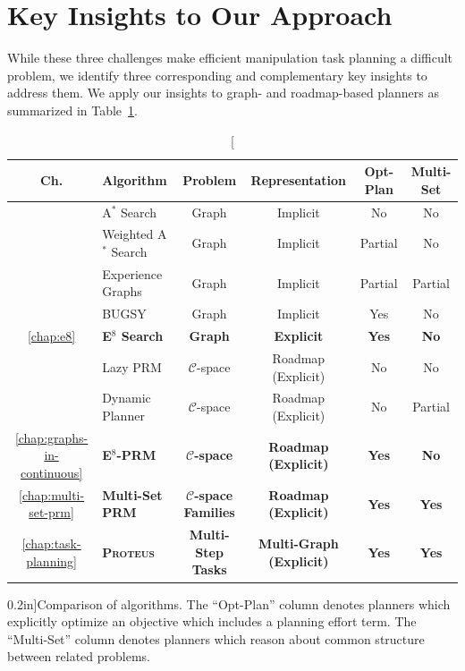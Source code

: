\section*{Key Insights to Our Approach}

While these three challenges make efficient
manipulation task planning a difficult problem,
we identify three corresponding and complementary
key insights to address them.
We apply our insights to graph- and roadmap-based planners
as summarized in Table~\ref{table:intro-algorithms}.

\begin{table}[t]
   \centering
   {\renewcommand{\arraystretch}{1.1}
   \begin{tabular}{clcccc}
   \toprule
   {\bf Ch.} & Algorithm & Problem & Representation & Opt-Plan & Multi-Set \\
   \midrule
   & A$^*$ Search \citep{hart1968astar} & Graph & Implicit & No & No \\
   & Weighted A$^*$ Search & Graph & Implicit & Partial & No \\
   & Experience Graphs \citep{phillips2012egraphs} & Graph & Implicit & Partial & Partial \\
   & BUGSY \citep{ruml2007bugsy} & Graph & Implicit & Yes & No \\
    \ref{chap:e8}
      & {\bf E$^8$ Search}
      & {\bf Graph} & {\bf Explicit} & {\bf Yes} & {\bf No} \\
   \midrule
   & Lazy PRM \citep{bohlin2000lazyprm} & $\mathcal{C}$-space & Roadmap (Explicit) & No & No \\
   & Dynamic Planner \citep{jaillet2004dynamicprm} & $\mathcal{C}$-space & Roadmap (Explicit) & No & Partial \\
   \ref{chap:graphs-in-continuous}
      & {\bf E$^8$-PRM}
      & {\bf $\mathcal{C}$-space} & {\bf Roadmap (Explicit)} & {\bf Yes} & {\bf No} \\
   \ref{chap:multi-set-prm}
      & {\bf Multi-Set PRM}
      & {\bf $\mathcal{C}$-space Families} & {\bf Roadmap (Explicit)} & {\bf Yes} & {\bf Yes} \\
   \midrule
   \ref{chap:task-planning}
      & {\bf \textsc{Proteus}}
      & {\bf Multi-Step Tasks} & {\bf Multi-Graph (Explicit)} & {\bf Yes} & {\bf Yes} \\
   \bottomrule
   \end{tabular}
   } %
   \caption[][0.2in]{Comparison of algorithms.
      The ``Opt-Plan'' column denotes planners which explicitly
      optimize an objective which includes a planning effort term.
      The ``Multi-Set'' column denotes planners which reason about
      common structure between related problems.}
   \label{table:intro-algorithms}
\end{table}

